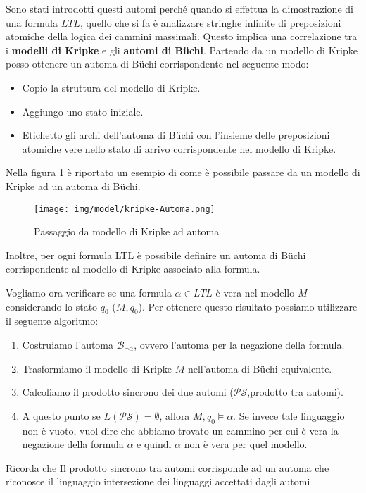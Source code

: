 Sono stati introdotti questi automi perché quando si effettua la dimostrazione di
una formula $LTL$, quello che si fa è analizzare stringhe infinite di preposizioni
atomiche della logica dei cammini massimali. Questo implica una correlazione tra
i \textbf{modelli di Kripke} e gli \textbf{automi di Büchi}. Partendo da un modello
di Kripke posso ottenere un automa di Büchi corrispondente nel seguente modo:
\begin{itemize}
    \item Copio la struttura del modello di Kripke.
    \item Aggiungo uno stato iniziale.
    \item Etichetto gli archi dell'automa di Büchi con l'insieme delle preposizioni
          atomiche vere nello stato di arrivo corrispondente nel modello di Kripke.
\end{itemize}

\begin{esempio}
    Nella figura \ref{fig:kripke-automa} è riportato un esempio di come è
    possibile passare da un modello di Kripke ad un automa di Büchi.
    \begin{figure}
        \centering
        \texttt{[image: img/model/kripke-Automa.png]}
        \caption{Passaggio da modello di Kripke ad automa}
        \label{fig:kripke-automa}
    \end{figure}
\end{esempio}

Inoltre, per ogni formula LTL è possibile definire un automa di Büchi corrispondente
al modello di Kripke associato alla formula.

Vogliamo ora verificare se una formula $\alpha \in LTL$ è vera nel modello $M$
considerando lo stato $q_0$ ($M, q_0$). Per ottenere questo risultato possiamo
utilizzare il seguente algoritmo:
\begin{enumerate}
    \item Costruiamo l'automa $\mathcal{B}_{\lnot \alpha}$, ovvero l'automa per
          la negazione della formula.
    \item Trasformiamo il modello di Kripke $M$ nell'automa di Büchi equivalente.
    \item Calcoliamo il prodotto sincrono dei due automi ($\mathcal{PS}$,prodotto tra automi).
    \item A questo punto se $L(\mathcal{PS}) = \emptyset$, allora $M, q_0 \models
              \alpha$. Se invece tale linguaggio non è vuoto, vuol dire che
          abbiamo trovato un cammino per cui è vera la negazione della formula
          $\alpha$ e quindi $\alpha$ non è vera per quel modello.
\end{enumerate}
\begin{nota}
    Ricorda che Il prodotto sincrono tra automi corrisponde ad un automa che riconosce
    il linguaggio intersezione dei linguaggi accettati dagli automi
\end{nota}
